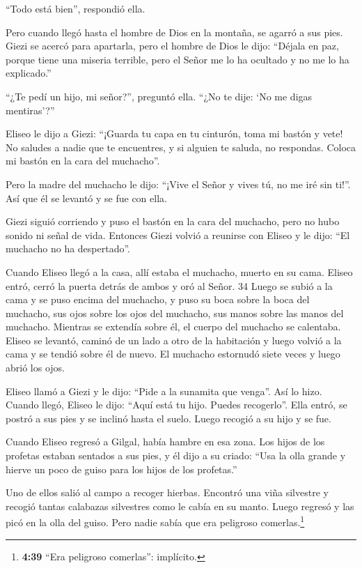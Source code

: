 ``Todo está bien'', respondió ella.

 Pero cuando llegó hasta el hombre de Dios en la montaña,
se agarró a sus pies. Giezi se acercó para apartarla, pero el hombre de
Dios le dijo: ``Déjala en paz, porque tiene una miseria terrible, pero
el Señor me lo ha ocultado y no me lo ha explicado.''

 ``¿Te pedí un hijo, mi señor?'', preguntó ella. ``¿No te
dije: `No me digas mentiras'?''

 Eliseo le dijo a Giezi: ``¡Guarda tu capa en tu cinturón,
toma mi bastón y vete! No saludes a nadie que te encuentres, y si
alguien te saluda, no respondas. Coloca mi bastón en la cara del
muchacho''.

 Pero la madre del muchacho le dijo: ``¡Vive el Señor y
vives tú, no me iré sin ti!''. Así que él se levantó y se fue con ella.

 Giezi siguió corriendo y puso el bastón en la cara del
muchacho, pero no hubo sonido ni señal de vida. Entonces Giezi volvió a
reunirse con Eliseo y le dijo: ``El muchacho no ha despertado''.

 Cuando Eliseo llegó a la casa, allí estaba el muchacho,
muerto en su cama.  Eliseo entró, cerró la puerta detrás de
ambos y oró al Señor. 34 Luego se subió a la cama y se puso encima del
muchacho, y puso su boca sobre la boca del muchacho, sus ojos sobre los
ojos del muchacho, sus manos sobre las manos del muchacho. Mientras se
extendía sobre él, el cuerpo del muchacho se calentaba. 
Eliseo se levantó, caminó de un lado a otro de la habitación y luego
volvió a la cama y se tendió sobre él de nuevo. El muchacho estornudó
siete veces y luego abrió los ojos.

 Eliseo llamó a Giezi y le dijo: ``Pide a la sunamita que
venga''. Así lo hizo. Cuando llegó, Eliseo le dijo: ``Aquí está tu hijo.
Puedes recogerlo''.  Ella entró, se postró a sus pies y se
inclinó hasta el suelo. Luego recogió a su hijo y se fue.

 Cuando Eliseo regresó a Gilgal, había hambre en esa zona.
Los hijos de los profetas estaban sentados a sus pies, y él dijo a su
criado: ``Usa la olla grande y hierve un poco de guiso para los hijos de
los profetas.''

 Uno de ellos salió al campo a recoger hierbas. Encontró
una viña silvestre y recogió tantas calabazas silvestres como le cabía
en su manto. Luego regresó y las picó en la olla del guiso. Pero nadie
sabía que era peligroso comerlas.\footnote{\textbf{4:39} ``Era peligroso
  comerlas'': implícito.}

